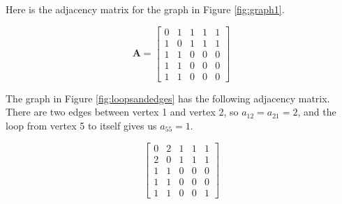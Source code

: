 \documentclass[
]{book}
\theoremstyle{definition}
\theoremstyle{definition}
\theoremstyle{definition}
\theoremstyle{definition}
\theoremstyle{remark}
\begin{document}
Here is the adjacency matrix for the graph in Figure \ref{fig:graph1}.

\[\mathbf{A}=\begin{bmatrix}
0 & 1 & 1 & 1 &  1\\
1 & 0 & 1 & 1 & 1\\
1 & 1 & 0 & 0 & 0 \\
1 & 1 & 0 & 0 & 0 \\
1 & 1 & 0 & 0 & 0
\end{bmatrix}\]

The graph in Figure \ref{fig:loopsandedges} has the following adjacency matrix. There are two edges between vertex 1 and vertex 2, so \(a_{12}=a_{21}=2\), and the loop from vertex 5 to itself gives us \(a_{55}=1.\)

\[\begin{bmatrix}
0 & 2 & 1 & 1 &  1\\
2 & 0 & 1 & 1 & 1 \\
1 & 1 & 0 & 0 & 0 \\
1 & 1 & 0 & 0 & 0\\
1 & 1 & 0 & 0 & 1
\end{bmatrix}\]
\end{document}

